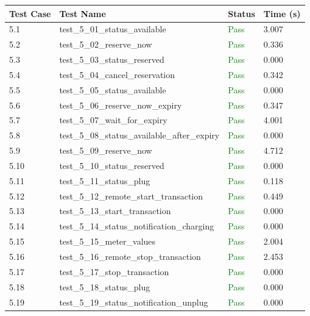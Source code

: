 \documentclass{article}
\begin{document}
\begin{longtable}{p{} p{} p{} p{}}
\toprule
\textbf{Test Case} & \textbf{Test Name} & \textbf{Status} & \textbf{Time (s)} \\
\midrule
\endhead
5.1 & test\_5\_01\_status\_available & \textcolor{green}{Pass} & 3.007 \\
5.2 & test\_5\_02\_reserve\_now & \textcolor{green}{Pass} & 0.336 \\
5.3 & test\_5\_03\_status\_reserved & \textcolor{green}{Pass} & 0.000 \\
5.4 & test\_5\_04\_cancel\_reservation & \textcolor{green}{Pass} & 0.342 \\
5.5 & test\_5\_05\_status\_available & \textcolor{green}{Pass} & 0.000 \\
5.6 & test\_5\_06\_reserve\_now\_expiry & \textcolor{green}{Pass} & 0.347 \\
5.7 & test\_5\_07\_wait\_for\_expiry & \textcolor{green}{Pass} & 4.001 \\
5.8 & test\_5\_08\_status\_available\_after\_expiry & \textcolor{green}{Pass} & 0.000 \\
5.9 & test\_5\_09\_reserve\_now & \textcolor{green}{Pass} & 4.712 \\
5.10 & test\_5\_10\_status\_reserved & \textcolor{green}{Pass} & 0.000 \\
5.11 & test\_5\_11\_status\_plug & \textcolor{green}{Pass} & 0.118 \\
5.12 & test\_5\_12\_remote\_start\_transaction & \textcolor{green}{Pass} & 0.449 \\
5.13 & test\_5\_13\_start\_transaction & \textcolor{green}{Pass} & 0.000 \\
5.14 & test\_5\_14\_status\_notification\_charging & \textcolor{green}{Pass} & 0.000 \\
5.15 & test\_5\_15\_meter\_values & \textcolor{green}{Pass} & 2.004 \\
5.16 & test\_5\_16\_remote\_stop\_transaction & \textcolor{green}{Pass} & 2.453 \\
5.17 & test\_5\_17\_stop\_transaction & \textcolor{green}{Pass} & 0.000 \\
5.18 & test\_5\_18\_status\_plug & \textcolor{green}{Pass} & 0.000 \\
5.19 & test\_5\_19\_status\_notification\_unplug & \textcolor{green}{Pass} & 0.000 \\
\bottomrule
\end{longtable}
\end{document}
